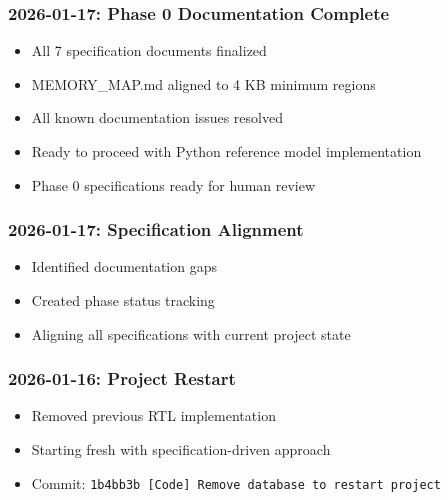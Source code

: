 \subsubsection{2026-01-17: Phase 0 Documentation Complete}\label{cr:status:phase-status:2026-01-17-phase-0-documentation-complete}

\begin{record}

\begin{itemize}
\tightlist
\item
  \ok{} All 7 specification documents finalized
\item
  \ok{} MEMORY\_\allowbreak{}MAP.md aligned to 4 KB minimum regions
\item
  \ok{} All known documentation issues resolved
\item
  Ready to proceed with Python reference model implementation
\item
  Phase 0 specifications ready for human review
\end{itemize}

\end{record}

\subsubsection{2026-01-17: Specification Alignment}\label{cr:status:phase-status:2026-01-17-specification-alignment}

\begin{record}

\begin{itemize}
\tightlist
\item
  Identified documentation gaps
\item
  Created phase status tracking
\item
  Aligning all specifications with current project state
\end{itemize}

\end{record}

\subsubsection{2026-01-16: Project Restart}\label{cr:status:phase-status:2026-01-16-project-restart}

\begin{record}

\begin{itemize}
\tightlist
\item
  Removed previous RTL implementation
\item
  Starting fresh with specification-driven approach
\item
  Commit:
  \texttt{1b4bb3b\ [Code]\ Remove\ database\ to\ restart\ project}
\end{itemize}

\end{record}

